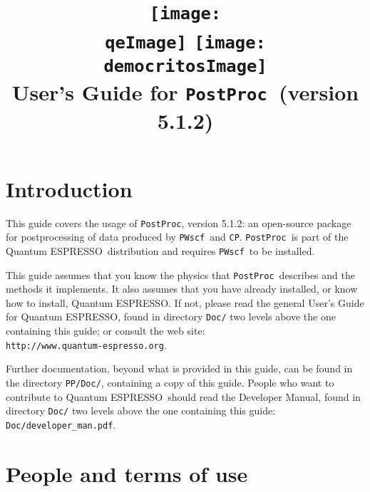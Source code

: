 \documentclass[12pt,a4paper]{article}
\def\version{5.1.2}
\def\qe{{\sc Quantum ESPRESSO}}
\def\PWscf{\texttt{PWscf}}
\def\CP{\texttt{CP}}
\def\PostProc{\texttt{PostProc}}
\begin{document}
 
\author{}
\date{}

\def\qeImage{../../Doc/quantum_espresso.pdf}
\def\democritosImage{../../Doc/democritos.pdf}

\begin{htmlonly}
\def\qeImage{quantum_espresso.png}
\def\democritosImage{democritos.png}
\end{htmlonly}

\title{
  \texttt{[image: \\qeImage]} \hskip 2cm
  \texttt{[image: \\democritosImage]}\\
  \vskip 1cm
  \Huge User's Guide for \PostProc\
  \Large (version \version)
}


\maketitle

\tableofcontents

\section{Introduction}

This guide covers the usage of \PostProc, version \version: 
an open-source package for postprocessing of data produced by
\PWscf\ and \CP. \PostProc\ is part of the \qe\ distribution 
and requires \PWscf\ to be installed.

This guide assumes that you know the physics 
that \PostProc\ describes and the methods it implements.
It also assumes  that you have already installed,
or know how to install, \qe. If not, please read
the general User's Guide for \qe, found in 
directory \texttt{Doc/} two levels above the 
one containing this guide; or consult the web site:\\
\texttt{http://www.quantum-espresso.org}.

Further documentation, beyond what is provided 
in this guide, can be found in the directory
\texttt{PP/Doc/}, containing a copy of this guide.
People who want to contribute to \qe\ should read the 
Developer Manual, found in directory \texttt{Doc/} two levels
above the one containing this guide: \texttt{Doc/developer\_man.pdf}.

\section{People and terms of use}
\end{document}
